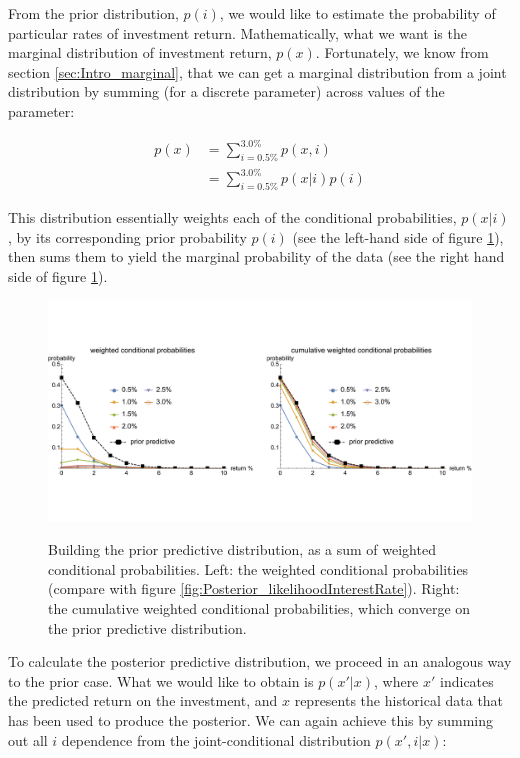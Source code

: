 \documentclass[11pt,fullpage]{book}
\begin{document}
From the prior distribution, $p(i)$, we would like to estimate the probability of particular rates of investment return. Mathematically, what we want is the marginal distribution of investment return, $p(x)$. Fortunately, we know from section \ref{sec:Intro_marginal}, that we can get a marginal distribution from a joint distribution by summing (for a discrete parameter) across values of the parameter:

\begin{equation}\label{eq:Posterior_InterestpriorPredictiveDistribution}
\begin{align}
p(x) &= \sum\limits_{i=0.5\%}^{3.0\%} p(x,i)\\
&= \sum\limits_{i=0.5\%}^{3.0\%} p(x|i) p(i)
\end{align}
\end{equation}

This distribution essentially weights each of the conditional probabilities, $p(x|i)$, by its corresponding prior probability $p(i)$ (see the left-hand side of figure \ref{fig:Posterior_priorBuildInterestRate}), then sums them to yield the marginal probability of the data (see the right hand side of figure \ref{fig:Posterior_priorBuildInterestRate}).

\begin{figure}
\centering
\scalebox{0.4} 
{\includegraphics{Posterior_priorBuildInterestRate.pdf}}
\caption{Building the prior predictive distribution, as a sum of weighted conditional probabilities. Left: the weighted conditional probabilities (compare with figure \ref{fig:Posterior_likelihoodInterestRate}). Right: the cumulative weighted conditional probabilities, which converge on the prior predictive distribution.}\label{fig:Posterior_priorBuildInterestRate}
\end{figure}

To calculate the posterior predictive distribution, we proceed in an analogous way to the prior case. What we would like to obtain is $p(x'|x)$, where $x'$ indicates the predicted return on the investment, and $x$ represents the historical data that has been used to produce the posterior. We can again achieve this by summing out all $i$ dependence from the joint-conditional distribution $p(x',i|x)$:
\end{document}

